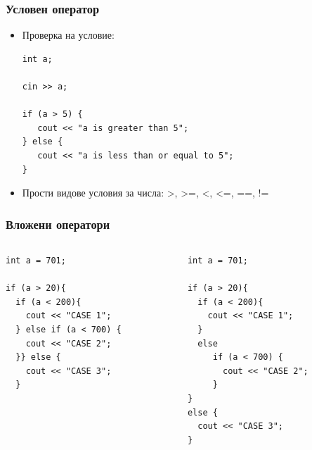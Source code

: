 \documentclass{beamer}
\begin{document}
\begin{frame}[fragile]
\frametitle{Условен оператор}
\begin{itemize}
\item Проверка на условие:
\begin{lstlisting}
int a;

cin >> a;

if (a > 5) {
   cout << "a is greater than 5";
} else {
   cout << "a is less than or equal to 5";
}
\end{lstlisting}
\item Прости видове условия за числа: >, >=, <, <=, ==, !=
\end{itemize}

\end{frame}

\begin{frame}[fragile]
\frametitle{Вложени оператори}



\begin{columns}
  \begin{column}{0.5\textwidth}
  \begin{lstlisting}
int a = 701;

if (a > 20){
  if (a < 200){
    cout << "CASE 1";
  } else if (a < 700) {
    cout << "CASE 2";
  }} else {
    cout << "CASE 3";
  }


\end{lstlisting}
  \end{column}

\pause

  \begin{column}{0.5\textwidth}
  \begin{lstlisting}
int a = 701;

if (a > 20){
  if (a < 200){
    cout << "CASE 1";
  }
  else
     if (a < 700) {
       cout << "CASE 2";
     }
}
else {
  cout << "CASE 3";
}
\end{lstlisting}
  \end{column}
\end{columns}



\end{frame}
\end{document}
